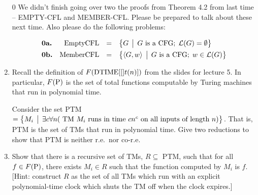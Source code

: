 \documentclass[12pt]{article}
\begin{document}
\thispagestyle{empty}
\noindent{}
\addtocounter{section}{5}

\begin{enumerate}
\item[0] We didn't finish going over two the proofs from Theorem 4.2 from last time -- EMPTY-CFL and
MEMBER-CFL.  Please be prepared to talk about these next time.  Also please do the following problems:

\[
\begin{array}{lrcl}
\textbf{0a.}&\mbox{{\rm EmptyCFL}} &=& \bigl\{ G \,\bigm|\, G \mbox{ is a CFG};\; {\cal L}(G) =
  \emptyset \bigr\} \\[1ex] 
\textbf{0b.}&\mbox{{\rm MemberCFL}} &=& \bigl\{ \langle G,w \rangle \,\bigm|\, G \mbox{ is a CFG};\;w\in{\cal L}(G) \bigr\}\\
\end{array}
\]


\item   Recall the definition of $F(\mbox{{\rm DTIME}}[[]t(n)])$ from the slides for lecture 5.  In particular,
  $F(\mbox{{\rm P}})$ is the set of total functions computable by Turing machines that run in polynomial time.  

Consider the set PTM  
$=\bigl\{ M_i \,\bigm|\, \exists c \forall n(\mbox{ TM $M_i$ runs in time $cn^c$ on all inputs of length $n$}
  ) \bigr\}$. 
That is, PTM is the set of TMs that run in polynomial time.
Give two reductions to show that PTM is neither r.e.\ nor co-r.e.

\item Show that there is a recursive set of TMs, $R \subseteq$ PTM, such that for all $f \in F(\mbox{{\rm P}})$,
  there exists $M_i \in R$ such that the function computed by $M_i$ is $f$.  [Hint:  construct $R$
    as the set of all TMs which run with an explicit polynomial-time clock which shuts the TM off
    when the clock expires.]
\end{enumerate}
\end{document}
